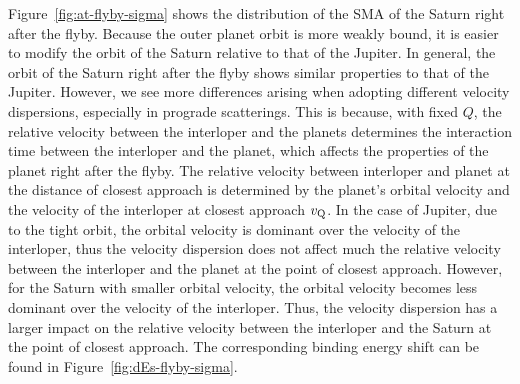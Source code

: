 \documentclass[twocolumn]{aastex63}
\newcommand*\fgr[1]{Figure~\ref{#1}}
\begin{document}
\fgr{fig:at-flyby-sigma} shows the distribution of the SMA of the Saturn right after the flyby. Because the outer planet orbit is more weakly bound, it is easier to modify the orbit of the Saturn relative to that of the Jupiter. In general, the orbit of the Saturn right after the flyby shows similar properties to that of the Jupiter. However, we see more differences arising when adopting different velocity dispersions, especially in prograde scatterings. This is because, with fixed $Q$, the relative velocity between the interloper and the planets determines the interaction time between the interloper and the planet, which affects the properties of the planet right after the flyby. The relative velocity between  interloper and planet at the distance of closest approach is determined by the planet's orbital velocity and the velocity of the interloper at closest approach $v_{\rm Q}$. In the case of Jupiter, due to the tight orbit, the orbital velocity is dominant over the velocity of the interloper, thus the velocity dispersion does not affect much the relative velocity between the interloper and the planet at the point of closest approach. However, for the Saturn with smaller orbital velocity, the orbital velocity becomes less dominant over the velocity of the interloper. Thus, the velocity dispersion has a larger impact on the relative velocity between the interloper and the Saturn at the point of closest approach. The corresponding binding energy shift can be found in \fgr{fig:dEs-flyby-sigma}.
\end{document}
